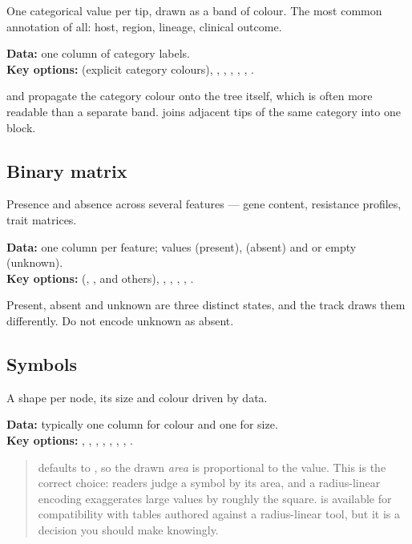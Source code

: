 One categorical value per tip, drawn as a band of colour. The most common
annotation of all: host, region, lineage, clinical outcome.

\textbf{Data:} one column of category labels.\\
\textbf{Key options:}  (explicit category colours), ,
, , , ,
.

 and  propagate the category colour onto
the tree itself, which is often more readable than a separate band.
 joins adjacent tips of the same category into one block.


\subsection{Binary matrix}

Presence and absence across several features --- gene content, resistance
profiles, trait matrices.

\textbf{Data:} one column per feature; values  (present),  (absent)
and  or empty (unknown).\\
\textbf{Key options:}  (, , and others),
, , ,
, .

Present, absent and unknown are three distinct states, and the track draws them
differently. Do not encode unknown as absent.


\subsection{Symbols}

A shape per node, its size and colour driven by data.

\textbf{Data:} typically one column for colour and one for size.\\
\textbf{Key options:} , ,
, , , ,
, .

\begin{quote}
 defaults to , so the drawn \emph{area} is proportional
to the value. This is the correct choice: readers judge a symbol by its area, and
a radius-linear encoding exaggerates large values by roughly the square.
 is available for compatibility with tables authored against a
radius-linear tool, but it is a decision you should make knowingly.
\end{quote}

